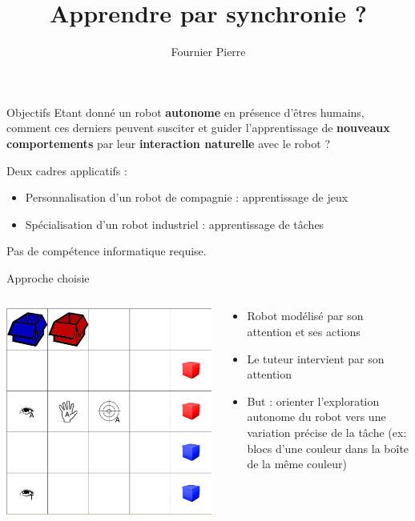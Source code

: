 \documentclass[xcolor=pst,dvips,12pt,english,french]{beamer}
\title{Apprendre par synchronie ?}
\author{Fournier Pierre}
\begin{document}
	\frame{\titlepage} 
	
	
	\begin{frame}{Objectifs}
		Etant donné un robot \textbf{autonome} en présence d'êtres humains, comment ces derniers peuvent susciter et guider l'apprentissage de \textbf{nouveaux comportements} par leur \textbf{interaction naturelle} avec le robot ?
		
		Deux cadres applicatifs :
		\begin{itemize}
			\item Personnalisation d'un robot de compagnie : apprentissage de jeux
			\item Spécialisation d'un robot industriel : apprentissage de tâches
		\end{itemize}
		Pas de compétence informatique requise.
	
	\end{frame}
	
	\begin{frame}{Approche choisie}
		\begin{columns}
			\begin{column}{0.55\textwidth}
				\includegraphics[width=\textwidth]{images/playroom.eps}
			\end{column}
			\begin{column}{0.45\textwidth}
				\begin{itemize}
					\item Robot modélisé par son attention et ses actions
					\item Le tuteur intervient par son attention
					\item But : orienter l'exploration autonome du robot vers une variation précise de la tâche (ex: blocs d'une couleur dans la boîte de la même couleur)
				\end{itemize}
			\end{column}
		\end{columns}
	\end{frame}
	
\end{document}

